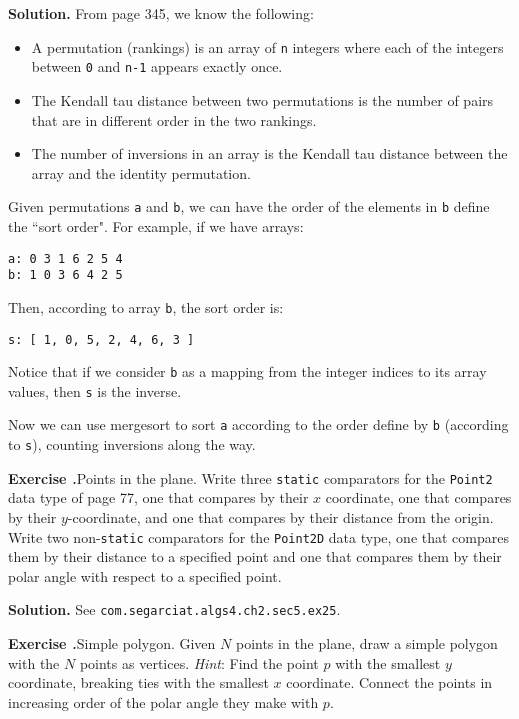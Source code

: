 \documentclass[12pt, a4paper]{article}
\newenvironment{ex}[2][Exercise]
{\par\medskip\noindent \textbf{#1 #2.}}
{\medskip}
\newenvironment{sol}[1][Solution]
{\par\medskip\noindent \textbf{#1.} }
{\medskip}
\begin{document}
	\begin{sol}
		From page 345, we know the following:
		\begin{itemize}
			\item A permutation (rankings) is an array of \texttt{n} integers where each of
			the integers between \texttt{0} and \texttt{n-1} appears exactly once.
			\item The Kendall tau distance between two permutations is the number of pairs
			that are in different order in the two rankings.
			\item The number of inversions in an array is the Kendall tau distance between
			the array and the identity permutation.
		\end{itemize}
		Given permutations \texttt{a} and \texttt{b}, we can have the order of the elements
		in \texttt{b} define the ``sort order". For example, if we have arrays:
		\begin{lstlisting}[language={}]
a: 0 3 1 6 2 5 4
b: 1 0 3 6 4 2 5
		\end{lstlisting}
		Then, according to array \texttt{b}, the sort order is:
		\begin{lstlisting}[language={}]
s: [ 1, 0, 5, 2, 4, 6, 3 ]
		\end{lstlisting}
		Notice that if we consider \texttt{b} as a mapping from the integer indices
		to its array values, then \texttt{s} is the inverse.
		
		Now we can use mergesort to sort \texttt{a} according to the order define
		by \texttt{b} (according to \texttt{s}), counting inversions along the
		way.
	\end{sol}
	\begin{ex}{25}
		\emph{Points in the plane}. Write three \texttt{static} comparators for the
		\texttt{Point2} data type of page 77, one that compares by their $x$ coordinate,
		one that compares by their $y$-coordinate, and one that compares by their distance
		from the origin. Write two non-\texttt{static} comparators for the \texttt{Point2D}
		data type, one that compares them by their distance to a specified point and one
		that compares them by their polar angle with respect to a specified point.
	\end{ex}
	\begin{sol}
		See \texttt{com.segarciat.algs4.ch2.sec5.ex25}.
	\end{sol}
	\begin{ex}{26}
		\emph{Simple polygon}. Given $N$ points in the plane, draw a simple polygon with the
		$N$ points as vertices. \emph{Hint}: Find the point $p$ with the smallest $y$ coordinate,
		breaking ties with the smallest $x$ coordinate. Connect the points in increasing order
		of the polar angle they make with $p$.
	\end{ex}
\end{document}
